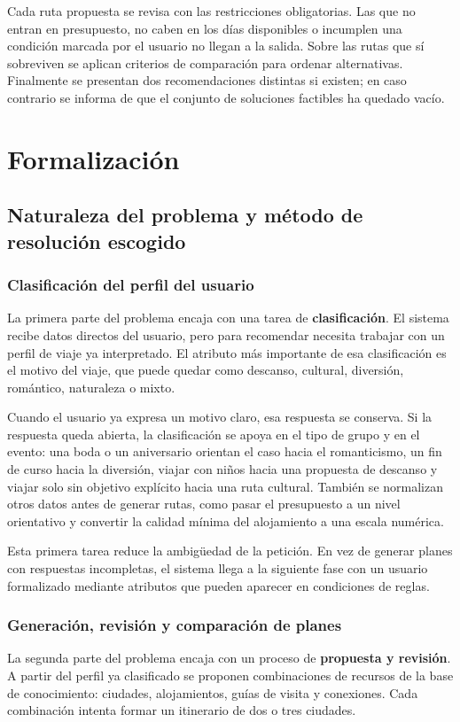 \documentclass[11pt,a4paper]{article}
\begin{document}
Cada ruta propuesta se revisa con las restricciones obligatorias. Las que no
entran en presupuesto, no caben en los d\'ias disponibles o incumplen una
condici\'on marcada por el usuario no llegan a la salida. Sobre las rutas que
s\'i sobreviven se aplican criterios de comparaci\'on para ordenar alternativas.
Finalmente se presentan dos recomendaciones distintas si existen; en caso
contrario se informa de que el conjunto de soluciones factibles ha quedado
vac\'io.

\section{Formalizaci\'on}
\subsection{Naturaleza del problema y m\'etodo de resoluci\'on escogido}
\subsubsection{Clasificaci\'on del perfil del usuario}
La primera parte del problema encaja con una tarea de \textbf{clasificaci\'on}.
El sistema recibe datos directos del usuario, pero para recomendar necesita
trabajar con un perfil de viaje ya interpretado. El atributo m\'as importante de
esa clasificaci\'on es el motivo del viaje, que puede quedar como descanso,
cultural, diversi\'on, rom\'antico, naturaleza o mixto.

Cuando el usuario ya expresa un motivo claro, esa respuesta se conserva. Si la
respuesta queda abierta, la clasificaci\'on se apoya en el tipo de grupo y en el
evento: una boda o un aniversario orientan el caso hacia el romanticismo, un
fin de curso hacia la diversi\'on, viajar con ni\~nos hacia una propuesta de
descanso y viajar solo sin objetivo expl\'icito hacia una ruta cultural. Tambi\'en
se normalizan otros datos antes de generar rutas, como pasar el presupuesto a
un nivel orientativo y convertir la calidad m\'inima del alojamiento a una
escala num\'erica.

Esta primera tarea reduce la ambig\"uedad de la petici\'on. En vez de generar
planes con respuestas incompletas, el sistema llega a la siguiente fase con un
usuario formalizado mediante atributos que pueden aparecer en condiciones de
reglas.

\subsubsection{Generaci\'on, revisi\'on y comparaci\'on de planes}
La segunda parte del problema encaja con un proceso de
\textbf{propuesta y revisi\'on}. A partir del perfil ya clasificado se proponen
combinaciones de recursos de la base de conocimiento: ciudades, alojamientos,
gu\'ias de visita y conexiones. Cada combinaci\'on intenta formar un itinerario
de dos o tres ciudades.
\end{document}
